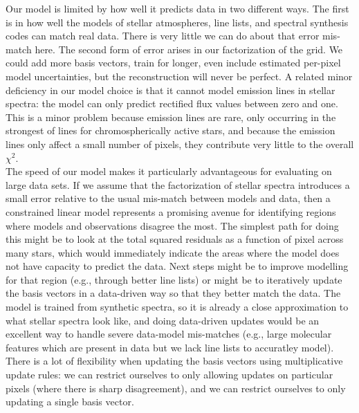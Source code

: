 \documentclass[modern]{aastex631}
\begin{document}
Our model is limited by how well it predicts data in two different ways. The first is in how well the models of stellar atmospheres, line lists, and spectral synthesis codes can match real data. There is very little we can do about that error mis-match here. The second form of error arises in our factorization of the grid. We could add more basis vectors, train for longer, even include estimated per-pixel model uncertainties, but the reconstruction will never be perfect. A related minor deficiency in our model choice is that it cannot model emission lines in stellar spectra: the model can only predict rectified flux values between zero and one. This is a minor problem because emission lines are rare, only occurring in the strongest of lines for chromospherically active stars, and because the emission lines only affect a small number of pixels, they contribute very little to the overall $\chi^2$.\\

The speed of our model makes it particularly advantageous for evaluating on large data sets. If we assume that the factorization of stellar spectra introduces a small error relative to the usual mis-match between models and data, then a constrained linear model represents a promising avenue for identifying regions where models and observations disagree the most. The simplest path for doing this might be to look at the total squared residuals as a function of pixel across many stars, which would immediately indicate the areas where the model does not have capacity to predict the data. Next steps might be to improve modelling for that region (e.g., through better line lists) or might be to iteratively update the basis vectors in a data-driven way so that they better match the data. The model is trained from synthetic spectra, so it is already a close approximation to what stellar spectra look like, and doing data-driven updates would be an excellent way to handle severe data-model mis-matches (e.g., large molecular features which are present in data but we lack line lists to accuratley model). There is a lot of flexibility when updating the basis vectors using multiplicative update rules: we can restrict ourselves to only allowing updates on particular pixels (where there is sharp disagreement), and we can restrict ourselves to only updating a single basis vector.\\

\end{document}

